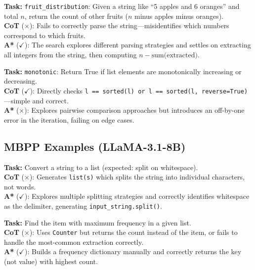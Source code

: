 \documentclass[10pt]{article}
\begin{document}
{\begin{examplebox}[title=HumanEval/67 --- A* Correct{,} CoT Wrong]
\textbf{Task:} \texttt{fruit\_distribution}: Given a string like ``5 apples and 6 oranges'' and total $n$, return the count of other fruits ($n$ minus apples minus oranges).\\[4pt]
\textbf{CoT} ($\times$): Fails to correctly parse the string---misidentifies which numbers correspond to which fruits.\\[4pt]
\textbf{A*} ($\checkmark$): The search explores different parsing strategies and settles on extracting all integers from the string, then computing $n - \text{sum(extracted)}$.
\end{examplebox}

\begin{examplebox}[title=HumanEval/57 --- CoT Correct{,} A* Wrong]
\textbf{Task:} \texttt{monotonic}: Return True if list elements are monotonically increasing or decreasing.\\[4pt]
\textbf{CoT} ($\checkmark$): Directly checks \texttt{l == sorted(l) or l == sorted(l, reverse=True)}---simple and correct.\\[4pt]
\textbf{A*} ($\times$): Explores pairwise comparison approaches but introduces an off-by-one error in the iteration, failing on edge cases.
\end{examplebox}

\subsection{MBPP Examples (LLaMA-3.1-8B)}

\begin{examplebox}[title=MBPP/118 --- A* Correct{,} CoT Wrong]
\textbf{Task:} Convert a string to a list (expected: split on whitespace).\\[4pt]
\textbf{CoT} ($\times$): Generates \texttt{list(s)} which splits the string into individual characters, not words.\\[4pt]
\textbf{A*} ($\checkmark$): Explores multiple splitting strategies and correctly identifies whitespace as the delimiter, generating \texttt{input\_string.split()}.
\end{examplebox}

\begin{examplebox}[title=MBPP/130 --- A* Correct{,} CoT Wrong]
\textbf{Task:} Find the item with maximum frequency in a given list.\\[4pt]
\textbf{CoT} ($\times$): Uses \texttt{Counter} but returns the count instead of the item, or fails to handle the most-common extraction correctly.\\[4pt]
\textbf{A*} ($\checkmark$): Builds a frequency dictionary manually and correctly returns the key (not value) with highest count.
\end{examplebox}

}
\end{document}
